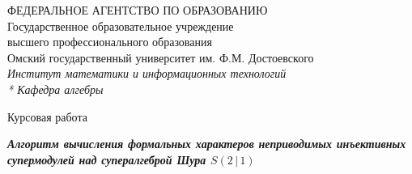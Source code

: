 \begin{titlepage}
	\newpage

	\begin{center}
	    ФЕДЕРАЛЬНОЕ АГЕНТСТВО ПО ОБРАЗОВАНИЮ \\
	    \vspace{3mm}
    	Государственное образовательное учреждение \\
		высшего профессионального образования\\
	    \vspace{3mm}
		Омский государственный университет им. Ф.М. Достоевского\\
	    \vspace{3mm}
	    \textit{Институт математики и информационных технологий \\*
		       Кафедра алгебры}
	\end{center}

	\vfill\vfill\vfill\vfill
	\begin{center}
		\Large{Курсовая работа}
	\end{center}
	\vfill

	\begin{center}
		\Large\textbf{\textit{Алгоритм вычисления формальных характеров 
		                      неприводимых инъективных супермодулей 
		                      над супералгеброй Шура $ S(2\,|\,1) $ }}
	\end{center}


	
	\vfill\vfill\vfill\vfill
	
	\begin{singlespace}
    \large {
        {}

        {}\hspace{9.5cm}{студент группы МПС-703-О}

        {}\hspace{9.5cm}{специальности <<Прикладная}

        {}\hspace{9.5cm}{математика и информатика>>}

        {}\hspace{9.5cm}{Уляшев П.А.} 
        
        \vspace{2mm}

        {}\hspace{9.5cm}{\underline{{}\hspace{5cm}{}}} \vspace{-0.7mm}

}
\end{singlespace}
\end{titlepage}
